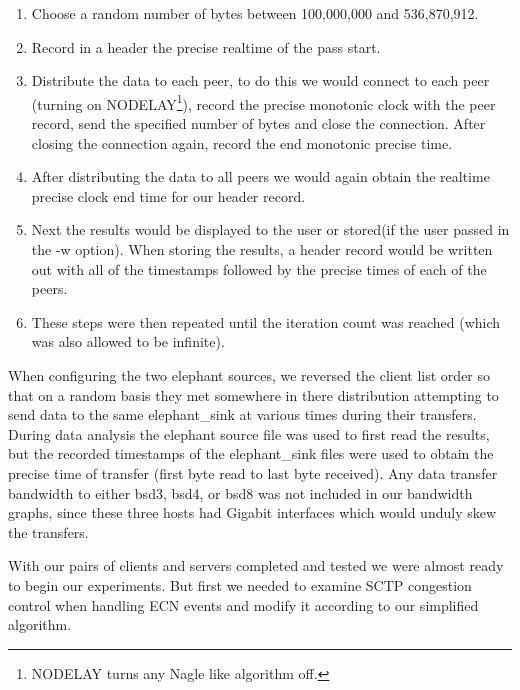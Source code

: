 \documentclass[12pt]{article}
\begin{document}
\begin{enumerate}

\item Choose a random number of bytes between 100,000,000 and 536,870,912.

\item Record in a header the precise realtime of the pass start.

\item Distribute the data to each peer, to do this we would connect to each peer (turning on 
NODELAY\footnote{NODELAY turns any Nagle\cite{rfc896} like algorithm off.}), record the
precise monotonic clock with the peer record, send the specified number of bytes
and close the connection. After closing the connection again, record the end monotonic 
precise time.

\item After distributing the data to all peers we would again obtain the realtime precise
clock end time for our header record.


\item Next the results would be displayed to the user or stored(if the user passed in the -w option). When storing the
results, a header record would be written out with all of the timestamps followed
by the precise times of each of the peers.

\item These steps were then repeated until the iteration count was reached (which was
also allowed to be infinite).

\end{enumerate}

When configuring the two elephant sources, we reversed the client list order so that on a random
basis they met somewhere in there distribution attempting to send data to the same elephant\_sink at various
times during their transfers. During data analysis the elephant source file was used to first read the results, but the 
recorded timestamps of the elephant\_sink files were used to obtain the precise time of transfer (first byte
read to last byte received). Any data transfer bandwidth to either bsd3, bsd4, or bsd8 was not included in
our bandwidth graphs, since these three hosts had Gigabit interfaces which would unduly skew the
transfers.

With our pairs of clients and servers completed and tested we were almost ready to 
begin our experiments. But first we needed to examine SCTP congestion control
when handling ECN events and modify it according to our simplified algorithm.
\end{document}
